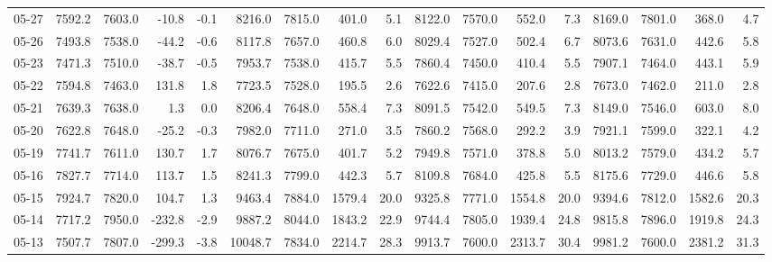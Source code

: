 \begin{threeparttable}
{\begin{tabular}{lrrrrrrrrrrrrrrrr}
  05-27 & 7592.2 & 7603.0 &      -10.8 &           -0.1 &  8216.0 & 7815.0 &      401.0 &            5.1 & 8122.0 & 7570.0 &      552.0 &            7.3 & 8169.0 & 7801.0 &       368.0 &              4.7 \\
  05-26 & 7493.8 & 7538.0 &      -44.2 &           -0.6 &  8117.8 & 7657.0 &      460.8 &            6.0 & 8029.4 & 7527.0 &      502.4 &            6.7 & 8073.6 & 7631.0 &       442.6 &              5.8 \\
  05-23 & 7471.3 & 7510.0 &      -38.7 &           -0.5 &  7953.7 & 7538.0 &      415.7 &            5.5 & 7860.4 & 7450.0 &      410.4 &            5.5 & 7907.1 & 7464.0 &       443.1 &              5.9 \\
  05-22 & 7594.8 & 7463.0 &      131.8 &            1.8 &  7723.5 & 7528.0 &      195.5 &            2.6 & 7622.6 & 7415.0 &      207.6 &            2.8 & 7673.0 & 7462.0 &       211.0 &              2.8 \\
  05-21 & 7639.3 & 7638.0 &        1.3 &            0.0 &  8206.4 & 7648.0 &      558.4 &            7.3 & 8091.5 & 7542.0 &      549.5 &            7.3 & 8149.0 & 7546.0 &       603.0 &              8.0 \\
  05-20 & 7622.8 & 7648.0 &      -25.2 &           -0.3 &  7982.0 & 7711.0 &      271.0 &            3.5 & 7860.2 & 7568.0 &      292.2 &            3.9 & 7921.1 & 7599.0 &       322.1 &              4.2 \\
  05-19 & 7741.7 & 7611.0 &      130.7 &            1.7 &  8076.7 & 7675.0 &      401.7 &            5.2 & 7949.8 & 7571.0 &      378.8 &            5.0 & 8013.2 & 7579.0 &       434.2 &              5.7 \\
  05-16 & 7827.7 & 7714.0 &      113.7 &            1.5 &  8241.3 & 7799.0 &      442.3 &            5.7 & 8109.8 & 7684.0 &      425.8 &            5.5 & 8175.6 & 7729.0 &       446.6 &              5.8 \\
  05-15 & 7924.7 & 7820.0 &      104.7 &            1.3 &  9463.4 & 7884.0 &     1579.4 &           20.0 & 9325.8 & 7771.0 &     1554.8 &           20.0 & 9394.6 & 7812.0 &      1582.6 &             20.3 \\
  05-14 & 7717.2 & 7950.0 &     -232.8 &           -2.9 &  9887.2 & 8044.0 &     1843.2 &           22.9 & 9744.4 & 7805.0 &     1939.4 &           24.8 & 9815.8 & 7896.0 &      1919.8 &             24.3 \\
  05-13 & 7507.7 & 7807.0 &     -299.3 &           -3.8 & 10048.7 & 7834.0 &     2214.7 &           28.3 & 9913.7 & 7600.0 &     2313.7 &           30.4 & 9981.2 & 7600.0 &      2381.2 &             31.3 \\

\end{tabular}}
\end{threeparttable}
